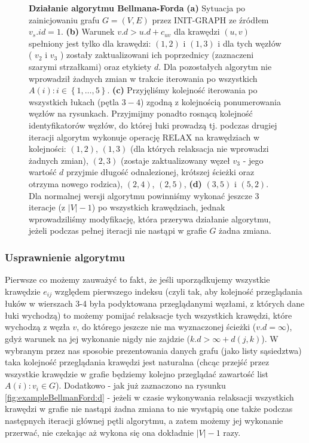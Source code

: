 \begin{figure}[!htbp]
	\caption{\textbf{Działanie algorytmu Bellmana-Forda} \textbf{(a)} Sytuacja po zainicjowaniu grafu $G = \left( V, E \right)$ przez \textsf{INIT-GRAPH} ze źródłem $v_{s}.id = 1$. \textbf{(b)} Warunek $ v.d > u.d + c_{uv} $ dla krawędzi $ \left( u, v \right) $ spełniony jest tylko dla krawędzi: $ \left( 1, 2 \right) $ i $ \left( 1, 3 \right) $ i dla tych węzłów ( $v_{2}$ i $v_{3}$ ) zostały zaktualizowani ich poprzednicy (zaznaczeni szarymi strzałkami) oraz etykiety $d$. Dla pozostałych algorytm nie wprowadził żadnych zmian w trakcie iterowania po wszystkich $ A \left( i \right) : i \in \left\{ 1, \ldots, 5\right\}$. \textbf{(c)} Przyjęliśmy kolejność iterowania po wszystkich łukach (pętla $3-4$) zgodną z kolejnością ponumerowania węzłów na rysunkach. Przyjmijmy ponadto rosnącą kolejność identyfikatorów węzłów, do której łuki prowadzą tj. podczas drugiej iteracji algorytm wykonuje operację \textsf{RELAX} na krawędziach w kolejności: $ \left( 1, 2 \right) $, $ \left( 1, 3 \right) $ (dla których relaksacja nie wprowadzi żadnych zmian), $ \left( 2, 3 \right) $ (zostaje zaktualizowany węzeł $v_{3}$ - jego wartość $d$ przyjmie długość odnalezionej, krótszej ścieżki oraz otrzyma nowego rodzica), $ \left( 2, 4 \right) $, $ \left( 2, 5 \right) $, \textbf{(d)} $ \left( 3, 5 \right) $ i $ \left( 5, 2 \right) $. Dla normalnej wersji algorytmu powinniśmy wykonać jeszcze 3 iteracje (z $ \left| V \right| - 1 $) po wszystkich krawędziach, jednak wprowadziliśmy modyfikację, która przerywa działanie algorytmu, jeżeli podczas pełnej iteracji nie nastąpi w grafie $G$ żadna zmiana.} \label{fig:exampleBellmanFord}
\end{figure}

\subsubsection{Usprawnienie algorytmu}

Pierwsze co możemy zauważyć to fakt, że jeśli uporządkujemy wszystkie krawędzie $e_{ij}$ względem pierwszego indeksu (czyli tak, aby kolejność przeglądania łuków w wierszach 3-4 była podyktowana przeglądanymi węzłami, z których dane łuki wychodzą) to możemy pomijać relaksacje tych wszystkich krawędzi, które wychodzą z węzła $v$, do którego jeszcze nie ma wyznaczonej ścieżki ($v.d = \infty$), gdyż warunek na jej wykonanie nigdy nie zajdzie ($ k.d > \infty + d \left( j, k \right)$). W wybranym przez nas sposobie prezentowania danych grafu (jako listy sąsiedztwa) taka kolejność przeglądania krawędzi jest naturalna (chcąc przejść przez wszystkie krawędzie w grafie będziemy kolejno przeglądać zawartość list $ A \left( i \right) : v_{i} \in G$). Dodatkowo - jak już zaznaczono na rysunku \ref{fig:exampleBellmanFord:d} - jeżeli w czasie wykonywania relaksacji wszystkich krawędzi w grafie nie nastąpi żadna zmiana to nie wystąpią one także podczas następnych iteracji głównej pętli algorytmu, a zatem możemy jej wykonanie przerwać, nie czekając aż wykona się ona dokładnie $ \left| V \right| - 1$ razy.

